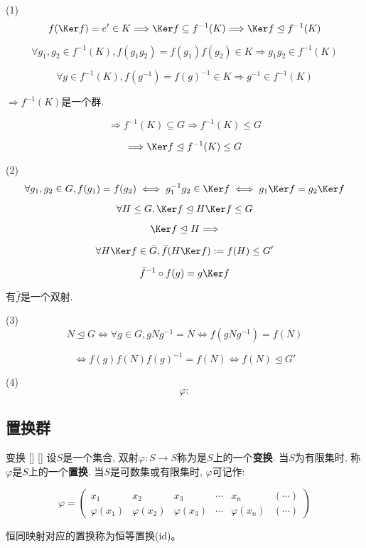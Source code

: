 \documentclass[UTF8]{ctexart}
\begin{document}
		\begin{prf}
			
			(1)$$f(\Ker f)=e'\in K\Longrightarrow\Ker f\subseteq f^{-1}(K)\Longrightarrow\Ker f\trianglelefteq f^{-1}(K)$$
			
			$$\forall g_1,g_2\in f^{-1}(K), f(g_1g_2)=f(g_1)f(g_2)\in K\Longrightarrow g_1g_2\in f^{-1}(K)$$
			
			$$\forall g\in f^{-1}(K), f(g^{-1})=f(g)^{-1}\in K\Longrightarrow g^{-1}\in f^{-1}(K)$$
			
			$\Longrightarrow f^{-1}(K)$是一个群. 
			
			$$\Longrightarrow f^{-1}(K)\subseteq G\Longrightarrow f^{-1}(K)\leq G$$
			
			$$\Longrightarrow \Ker f\trianglelefteq f^{-1}(K)\leq G$$
			
			(2)$$\forall g_1,g_2\in G, f(g_1)=f(g_2)\iff g_1^{-1}g_2\in\Ker f\iff g_1\Ker f=g_2\Ker f$$
			
			$$\forall H\leq G, \Ker f\trianglelefteq H\Ker f\leq G$$
			
			$$\Ker f\trianglelefteq H\Longrightarrow $$
			
			$$\forall H\Ker f\in\bar G, \bar f(H\Ker f):=f(H)\leq G'$$
			
			$$\bar f^{-1}\circ f(g)=g\Ker f$$
			
			有$\bar f$是一个双射. 
			
			(3)$$N\trianglelefteq G\iff\forall g\in G, gNg^{-1}=N\iff f(gNg^{-1})=f(N)$$
			
			$$\iff f(g)f(N)f(g)^{-1}=f(N)\iff f(N)\trianglelefteq G'$$
			
			(4)$$\varphi:$$
		\end{prf}
        \subsection{置换群}
	
		\begin{dfn}
            []
            {变换}
            []
            []
			设$S$是一个集合, 双射$\varphi:S\to S$称为是$S$上的一个\textbf{变换}. 当$S$为有限集时, 称$\varphi$是$S$上的一个\textbf{置换}. 当$S$是可数集或有限集时, $\varphi$可记作: 
			
			\[\varphi=
			\begin{pmatrix}
			x_1 & x_2 & x_3 & \cdots & x_n & (\cdots)\\
			\varphi(x_1) & \varphi(x_2) & \varphi(x_3) & \cdots & \varphi(x_n) & (\cdots)
			\end{pmatrix}\]
			
			恒同映射对应的置换称为恒等置换(id)。

		\end{dfn}
			
\end{document}
